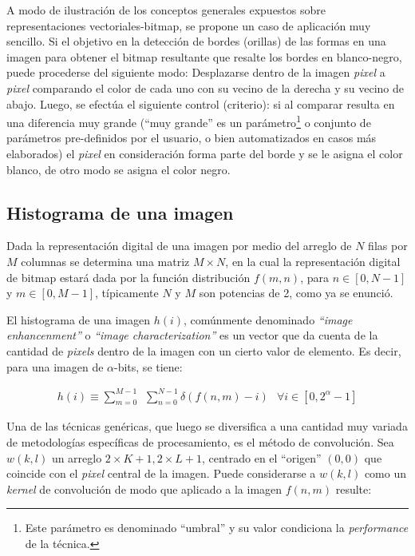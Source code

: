 A modo de ilustraci\'on de los conceptos generales expuestos sobre representaciones vectoriales-bitmap, se propone un caso de aplicaci\'on muy sencillo.
%
Si el objetivo en la detecci\'on de bordes (orillas) de las formas en una imagen para obtener el bitmap resultante que resalte los bordes
en blanco-negro, puede procederse del siguiente modo: Desplazarse dentro de la imagen \textit{pixel} a \textit{pixel} comparando el color de cada uno
con su vecino de la derecha y su vecino de abajo.
%
Luego, se efect\'ua el siguiente control (criterio): si al comparar resulta en una diferencia muy
grande (``muy grande'' es un par\'ametro\footnote{Este par\'ametro es denominado ``umbral'' y su valor condiciona la \textit{performance} de la t\'ecnica.}
o conjunto de par\'ametros pre-definidos por el usuario, o bien automatizados en casos m\'as elaborados)
el \textit{pixel} en consideraci\'on forma parte del borde y se le asigna el color blanco, de otro modo se asigna el color negro.
%

\subsection{Histograma de una imagen}

Dada la representaci\'on digital de una imagen por medio del arreglo de $N$ filas por $M$ columnas se determina una matriz $M \times N$, en la cual la
representaci\'on digital de bitmap estar\'a dada por la funci\'on distribuci\'on $f(m, n)$, para $n \in [0, N-1]$ y $m \in [0, M-1]$, t\'ipicamente
$N$ y $M$ son potencias de 2, como ya se enunci\'o.
%

%
El histograma de una imagen $h(i)$, com\'unmente denominado \textit{``image enhancenment''} o \textit{``image characterization''} es un vector que da cuenta de
la cantidad de \textit{pixels} dentro de la imagen con un cierto valor de elemento.
%
Es decir, para una imagen de $\alpha$-bits, se tiene:
%

\begin{eqnarray}
	h(i) \equiv \sum _{m=0}^{M-1} \, \; \sum _{n=0}^{N-1} \delta(f(n, m) - i) \; \, \; \forall i \in [0, 2^{\alpha}-1]
\label{EqXXIII}
\end{eqnarray}

%
Una de las t\'ecnicas gen\'ericas, que luego se diversifica a una cantidad muy variada de metodolog\'ias espec\'ificas de procesamiento, es el m\'etodo de
convoluci\'on.
%
Sea $w(k, l)$ un arreglo $2 \times K + 1, 2 \times L + 1$, centrado en el ``origen'' $(0, 0)$ que coincide con el \textit{pixel} central de la imagen.
%
Puede considerarse a $w(k, l)$ como un \textit{kernel} de convoluci\'on de modo que aplicado a la imagen $f(n, m)$ resulte:
%

